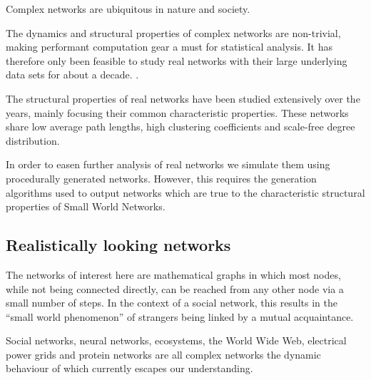 \documentclass[a4paper,11pt,titlepage]{article}
\begin{document}

Complex networks are ubiquitous in nature and society.

The dynamics and structural properties of complex networks are non-trivial,
making performant computation gear a must for statistical analysis.
It has therefore only been feasible to study real networks with their
large underlying data sets for about a decade.
\cite{oconn11}.

The structural properties of real networks have been studied extensively
over the years, mainly focusing their common characteristic properties.
These networks share low average path lengths, high clustering
coefficients and scale-free degree distribution.

In order to easen further analysis of real networks we simulate them
using procedurally generated networks. However, this requires the
generation algorithms used to output networks which are true to the
characteristic structural properties of Small World Networks.

\subsection{Realistically looking networks}


The networks of interest here are mathematical graphs in which most nodes,
while not being connected directly, can be reached from any other node via a
small number of steps. In the context of a social network, this results in the
``small world phenomenon'' \cite{smphen} of strangers
being linked by a mutual acquaintance.


Social networks, neural networks, ecosystems, the World Wide Web, electrical
power grids and protein networks are all complex networks the dynamic
behaviour of which currently escapes our understanding.

\end{document}
